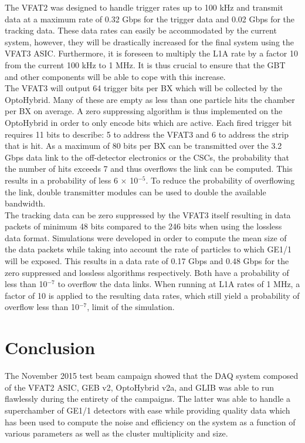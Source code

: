     The VFAT2 was designed to handle trigger rates up to 100 kHz and transmit data at a maximum rate of 0.32 Gbps for the trigger data and 0.02 Gbps for the tracking data. These data rates can easily be accommodated by the current system, however, they will be drastically increased for the final system using the VFAT3 ASIC. Furthermore, it is foreseen to multiply the L1A rate by a factor 10 from the current 100 kHz to 1 MHz. It is thus crucial to ensure that the GBT and other components will be able to cope with this increase. \\

    The VFAT3 will output 64 trigger bits per BX which will be collected by the OptoHybrid. Many of these are empty as less than one particle hits the chamber per BX on average. A zero suppressing algorithm is thus implemented on the OptoHybrid in order to only encode bits which are active. Each fired trigger bit requires 11 bits to describe: 5 to address the VFAT3 and 6 to address the strip that is hit. As a maximum of 80 bits per BX can be transmitted over the 3.2 Gbps data link to the off-detector electronics or the CSCs, the probability that the number of hits exceeds 7 and thus overflows the link can be computed. This results in a probability of less 6 $ \times $ 10$^{-5}$. To reduce the probability of overflowing the link, double transmitter modules can be used to double the available bandwidth. \\

    The tracking data can be zero suppressed by the VFAT3 itself resulting in data packets of minimum 48 bits compared to the 246 bits when using the lossless data format. Simulations were developed in order to compute the mean size of the data packets while taking into account the rate of particles to which GE1/1 will be exposed. This results in a data rate of 0.17 Gbps and 0.48 Gbps for the zero suppressed and lossless algorithms respectively. Both have a probability of less than 10$^{-7}$ to overflow the data links. When running at L1A rates of 1 MHz, a factor of 10 is applied to the resulting data rates, which still yield a probability of overflow less than 10$^{-7}$, limit of the simulation.

  \section{Conclusion}

    The November 2015 test beam campaign showed that the DAQ system composed of the VFAT2 ASIC, GEB v2, OptoHybrid v2a, and GLIB was able to run flawlessly during the entirety of the campaigns. The latter was able to handle a superchamber of GE1/1 detectors with ease while providing quality data which has been used to compute the noise and efficiency on the system as a function of various parameters as well as the cluster multiplicity and size. \\

